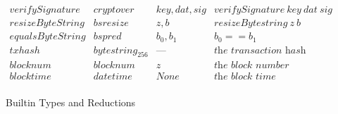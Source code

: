 \documentclass[../main.tex]{subfiles}
\begin{document}
\begin{figure*}[t]
\[\begin{array}{lllll}
        verifySignature   &  cryptover  &   key, dat, sig           & verifySignature \  key \  dat \  sig\\
        
        resizeByteString   &   bsresize   &   z, b   &   resizeBytestring \  z \  b\\
        
        equalsByteString  &   bspred   &   b_0 , b_1   & b_0 == b_1\\
        
        txhash   &   bytestring_{256}   &   \textrm{---}  & \textit{the transaction hash}\\
        
        blocknum  &  blocknum  & z & \textit{the block number}\\
        
        blocktime &  \mathit{datetime}  &  \textit{None}  & \textit{the block time}\\
    \end{array}\]
    
    \caption{Builtin Types and Reductions}
    \label{fig:Plutus_core_builtins}
\end{figure*}

\normalsize
\end{document}
